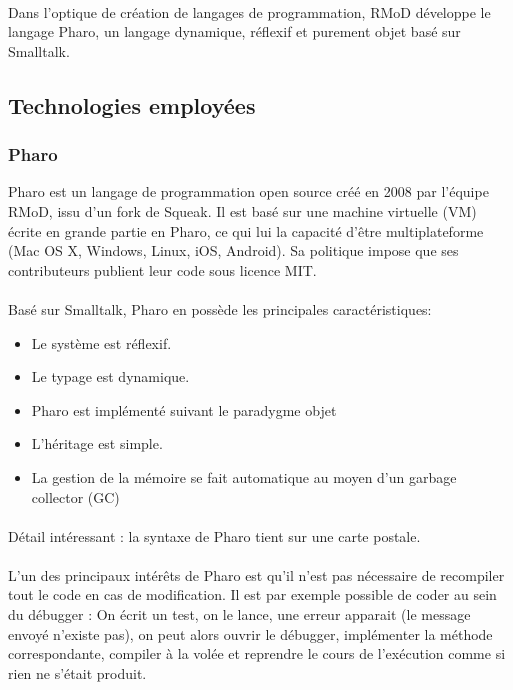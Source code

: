 	\paragraph{}
	Dans l'optique de création de langages de programmation, RMoD développe le langage Pharo, un langage dynamique, réflexif et purement objet basé sur Smalltalk.

	\newpage{}
	\subsection{Technologies employées}
	\subsubsection{Pharo}
	Pharo est un langage de programmation open source créé en 2008 par l'équipe RMoD, issu d'un fork de Squeak. Il est basé sur une machine virtuelle (VM) écrite en grande partie en Pharo, ce qui lui la capacité d'être multiplateforme (Mac OS X, Windows, Linux, iOS, Android). Sa politique impose que ses contributeurs publient leur code sous licence MIT.

	\paragraph{}
	Basé sur Smalltalk, Pharo en possède les principales caractéristiques:
	\begin{itemize}
		\item Le système est réflexif.
		\item Le typage est dynamique.
		\item Pharo est implémenté suivant le paradygme objet
		\item L'héritage est simple.
		\item La gestion de la mémoire se fait automatique au moyen d'un garbage collector (GC)
	\end{itemize}

	\paragraph{}
	Détail intéressant : la syntaxe de Pharo tient sur une carte postale.

	\paragraph{}
	L'un des principaux intérêts de Pharo est qu'il n'est pas nécessaire de recompiler tout le code en cas de modification. Il est par exemple possible de coder au sein du débugger : On écrit un test, on le lance, une erreur apparait (le message envoyé n'existe pas), on peut alors ouvrir le débugger, implémenter la méthode correspondante, compiler à la volée et reprendre le cours de l'exécution comme si rien ne s'était produit.

